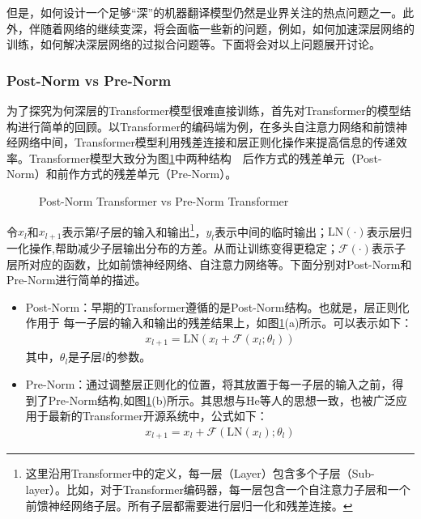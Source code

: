 \parinterval 但是，如何设计一个足够``深''的机器翻译模型仍然是业界关注的热点问题之一。此外，伴随着网络的继续变深，将会面临一些新的问题，例如，如何加速深层网络的训练，如何解决深层网络的过拟合问题等。下面将会对以上问题展开讨论。


\subsubsection{Post-Norm vs Pre-Norm}

\parinterval 为了探究为何深层的Transformer模型很难直接训练，首先对Transformer的模型结构进行简单的回顾。以Transformer的编码端为例，在多头自注意力网络和前馈神经网络中间，Transformer模型利用残差连接和层正则化操作来提高信息的传递效率。Transformer模型大致分为图\ref{fig:7-28}中两种结构\ \dash \ 后作方式的残差单元（Post-Norm）和前作方式的残差单元（Pre-Norm）。

\begin{figure}[htp]
\centering

\caption{Post-Norm Transformer vs Pre-Norm Transformer}
\label{fig:7-28}
\end{figure}

\parinterval 令$x_l$和$x_{l+1}$表示第$l$子层的输入和输出\footnote[13]{这里沿用Transformer中的定义，每一层（Layer）包含多个子层（Sub-layer）。比如，对于Transformer编码器，每一层包含一个自注意力子层和一个前馈神经网络子层。所有子层都需要进行层归一化和残差连接。}，$y_l$表示中间的临时输出；$\textrm{LN}(\cdot)$表示层归一化操作\cite{Ba2016LayerN},帮助减少子层输出分布的方差。从而让训练变得更稳定；$\mathcal{F}(\cdot)$表示子层所对应的函数，比如前馈神经网络、自注意力网络等。下面分别对Post-Norm和Pre-Norm进行简单的描述。
\begin{itemize}
\vspace{0.5em}
\item Post-Norm：早期的Transformer遵循的是Post-Norm结构\cite{NIPS2017_7181}。也就是，层正则化作用于 每一子层的输入和输出的残差结果上，如图\ref{fig:7-28}(a)所示。可以表示如下：
\begin{eqnarray}
x_{l+1}=\textrm{LN}(x_l+\mathcal{F}(x_l;\theta_l))
\label{eq:7-16}
\end{eqnarray}
其中，$\theta_l$是子层$l$的参数。
\vspace{0.5em}
\item Pre-Norm：通过调整层正则化的位置，将其放置于每一子层的输入之前，得到了Pre-Norm结构,如图\ref{fig:7-28}(b)所示。其思想与He等人的思想一致\cite{DBLP:conf/eccv/HeZRS16}，也被广泛应用于最新的Transformer开源系统中\cite{VaswaniTensor2Tensor,Ottfairseq,KleinOpenNMT}，公式如下：
\begin{eqnarray}
x_{l+1}=x_l+\mathcal{F}(\textrm{LN}(x_l);\theta_l)
\label{eq:7-17}
\end{eqnarray}
\end{itemize}

